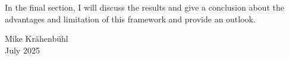 \documentclass[11pt,a4paper,twoside]{book}
\begin{document}
In the final section, I will discuss the results and give a conclusion about the 
advantages and limitation of this framework and provide an outlook.

\bigskip

\begin{flushright}
  Mike Kr{\"a}henb{\"u}hl\\
  July 2025
\end{flushright}


\cleardoublepage
{}




















\cleardoublepage
{}
{}


 








\cleardoublepage
\end{document}
